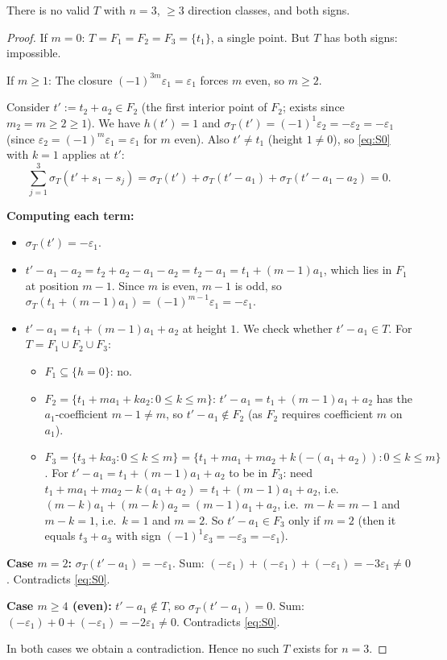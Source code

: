\begin{lemma}[$n=3$ impossible]\label{lem:n3}
There is no valid $T$ with $n=3$, $\geq 3$ direction classes, and both signs.
\end{lemma}
\begin{proof}
If $m=0$: $T = F_1 = F_2 = F_3 = \{t_1\}$, a single point.  But $T$ has both signs: impossible.

If $m \geq 1$: The closure $(-1)^{3m}\varepsilon_1 = \varepsilon_1$ forces $m$ even, so $m \geq 2$.

Consider $t' := t_2 + a_2 \in F_2$ (the first interior point of $F_2$; exists since $m_2 = m \geq 2 \geq 1$).
We have $h(t') = 1$ and $\sigma_T(t') = (-1)^1 \varepsilon_2 = -\varepsilon_2 = -\varepsilon_1$ (since $\varepsilon_2 = (-1)^m\varepsilon_1 = \varepsilon_1$ for $m$ even).
Also $t' \neq t_1$ (height $1 \neq 0$), so \eqref{eq:S0} with $k=1$ applies at $t'$:
\[
  \sum_{j=1}^{3} \sigma_T(t' + s_1 - s_j) = \sigma_T(t') + \sigma_T(t'-a_1) + \sigma_T(t'-a_1-a_2) = 0.
\]

\textbf{Computing each term:}
\begin{itemize}
\item $\sigma_T(t') = -\varepsilon_1$.
\item $t' - a_1 - a_2 = t_2 + a_2 - a_1 - a_2 = t_2 - a_1 = t_1 + (m-1)a_1$, which lies in $F_1$ at position $m-1$.
  Since $m$ is even, $m-1$ is odd, so $\sigma_T(t_1+(m-1)a_1) = (-1)^{m-1}\varepsilon_1 = -\varepsilon_1$.
\item $t' - a_1 = t_1 + (m-1)a_1 + a_2$ at height $1$.
  We check whether $t'-a_1 \in T$. For $T = F_1 \cup F_2 \cup F_3$:
  \begin{itemize}
  \item $F_1 \subseteq \{h=0\}$: no.
  \item $F_2 = \{t_1+ma_1+ka_2 : 0 \leq k \leq m\}$: $t'-a_1 = t_1+(m-1)a_1+a_2$ has the $a_1$-coefficient $m-1 \neq m$, so $t'-a_1 \notin F_2$ (as $F_2$ requires coefficient $m$ on $a_1$).
  \item $F_3 = \{t_3 + ka_3 : 0 \leq k \leq m\} = \{t_1+ma_1+ma_2 + k(-(a_1+a_2)) : 0 \leq k \leq m\}$.
    For $t'-a_1 = t_1+(m-1)a_1+a_2$ to be in $F_3$: need $t_1+ma_1+ma_2-k(a_1+a_2) = t_1+(m-1)a_1+a_2$, i.e.\ $(m-k)a_1+(m-k)a_2 = (m-1)a_1+a_2$, i.e.\ $m-k=m-1$ and $m-k=1$, i.e.\ $k=1$ and $m=2$.
    So $t'-a_1 \in F_3$ only if $m=2$ (then it equals $t_3+a_3$ with sign $(-1)^1\varepsilon_3 = -\varepsilon_3 = -\varepsilon_1$).
  \end{itemize}
\end{itemize}

\textbf{Case $m = 2$:}
$\sigma_T(t'-a_1) = -\varepsilon_1$. Sum:
$(-\varepsilon_1) + (-\varepsilon_1) + (-\varepsilon_1) = -3\varepsilon_1 \neq 0$.
Contradicts \eqref{eq:S0}. \checkmark

\textbf{Case $m \geq 4$ (even):}
$t'-a_1 \notin T$, so $\sigma_T(t'-a_1) = 0$. Sum:
$(-\varepsilon_1) + 0 + (-\varepsilon_1) = -2\varepsilon_1 \neq 0$.
Contradicts \eqref{eq:S0}. \checkmark

In both cases we obtain a contradiction.  Hence no such $T$ exists for $n=3$.
\end{proof}

